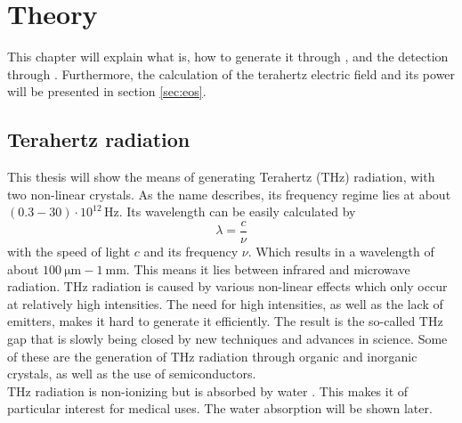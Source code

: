 \chapter{Theory}
This chapter will explain what  is, how to generate it through , and the detection through .
Furthermore, the calculation of the terahertz electric field and its power will be presented in section \ref{sec:eos}.
\section{Terahertz radiation}
\label{sec:terahertz}
This thesis will show the means of generating Terahertz ($\si{\tera\hertz}$) radiation, with two non-linear crystals.
As the name describes, its frequency regime lies at about $(0.3-30)\cdot10^{12}\,\si{\hertz}$.
Its wavelength can be easily calculated by
\begin{equation}
    \lambda = \frac{c}{\nu}
\end{equation}
with the speed of light $c$ and its frequency $\nu$.
Which results in a wavelength of about $\SI{100}{\micro\meter}-\SI{1}{\milli\meter}$.
This means it lies between infrared and microwave radiation.
$\si{\tera\hertz}$ radiation is caused by various non-linear effects which only occur at relatively high intensities.
The need for high intensities, as well as the lack of emitters, makes it hard to generate it efficiently.
The result is the so-called $\si{\tera\hertz}$ gap that is slowly being closed by new techniques and advances in science.
Some of these are the generation of $\si{\tera\hertz}$ radiation through organic and inorganic crystals, as well as the use of semiconductors.
\\
$\si{\tera\hertz}$ radiation is non-ionizing but is absorbed by water \cite{water_absorption}.
This makes it of particular interest for medical uses.
The water absorption will be shown later. 


